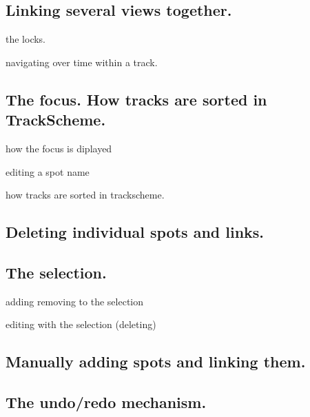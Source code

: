 \subsection{Linking several views together.}

the locks.

navigating over time within a track.


\subsection{The focus. How tracks are sorted in TrackScheme.}

how the focus is diplayed

editing a spot name

how tracks are sorted in trackscheme.

\subsection{Deleting individual spots and links.}

\subsection{The selection.}

adding removing to the selection

editing with the selection (deleting)

\subsection{Manually adding spots and linking them.}

\subsection{The undo/redo mechanism.}




